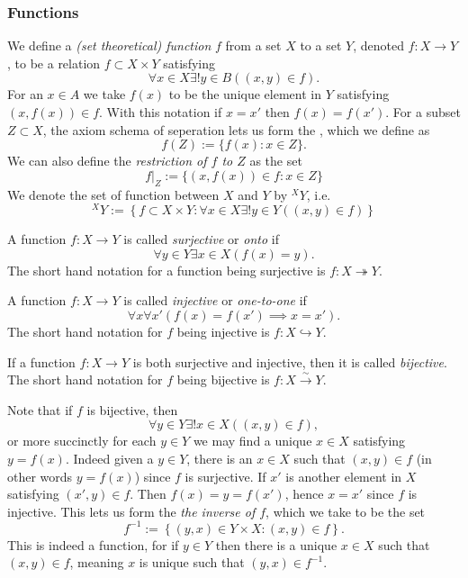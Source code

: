 \subsubsection{Functions}
\begin{definition}
    We define a \textit{(set theoretical) function} $f$ from a set $X$ to a set $Y$, denoted $f:X\rightarrow Y$, to be a relation $f\subset X\times Y$ satisfying
    $$\forall x\in X\exists! y\in B((x,y)\in f).$$
    For an $x\in A$ we take $f(x)$ to be the unique element in $Y$ satisfying $(x,f(x))\in f$. With this notation if $x=x'$ then $f(x)=f(x')$. For a subset $Z\subset X$, the axiom schema of seperation lets us form the , which we define as 
    $$f(Z) := \{ f(x) : x\in Z\}.$$
    We can also define the \textit{restriction of $f$ to $Z$} as the set 
    $$ \left. f\right|_Z := \{ (x,f(x))\in f : x\in Z\}$$
    We denote the set of function between $X$ and $Y$ by ${}^X\!Y$, i.e. 
    $${}^X\!Y := \left\{ f\subset X\times Y : \forall x\in X\exists! y \in Y((x,y)\in f)\right\} $$
\end{definition}
\begin{definition}
    A function $f : X\rightarrow Y$ is called \textit{surjective} or \textit{onto} if $$\forall y\in Y\exists x\in X (f(x)=y).$$ The short hand notation for a function being surjective is $f: X\twoheadrightarrow Y$.  
\end{definition}
\begin{definition}
    A function $f : X\rightarrow Y$ is called \textit{injective} or \textit{one-to-one} if $$\forall x\forall x'(f(x)=f(x')\implies x=x').$$
    The short hand notation for $f$ being injective is $f: X\hookrightarrow Y$.  
\end{definition}
\begin{definition}
    If a function $f: X \rightarrow Y$ is both surjective and injective, then it is called \textit{bijective}. The short hand notation for $f$ being bijective is $f: X \overset{\sim}{\rightarrow} Y$.
\end{definition}
\begin{remark}
    Note that if $f$ is bijective, then 
    $$\forall y\in Y\exists! x\in X((x,y)\in f),$$
    or more succinctly for each $y\in Y$ we may find a unique $x\in X$ satisfying $y=f(x)$. Indeed given a $y\in Y$, there is an $x\in X$ such that $(x,y)\in f$ (in other words $y=f(x)$) since $f$ is surjective. If $x'$ is another element in $X$ satisfying $(x',y)\in f$. Then $f(x)=y=f(x')$, hence $x=x'$ since $f$ is injective. This lets us form the \textit{the inverse of $f$}, which we take to be the set
    $$f^{-1}:= \left\{(y,x) \in Y\times X : (x,y) \in f \right\}.$$
    This is indeed a function, for if $y\in Y$ then there is a unique $x\in X$ such that $(x,y)\in f$, meaning $x$ is unique such that $(y,x)\in f^{-1}$. 
\end{remark}
